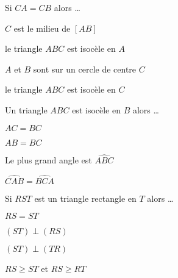 

  
\begin{QCM}
  \begin{GroupeQCM} 
    \begin{exercice}
      Si $CA = CB$ alors \ldots
      \begin{ChoixQCM}{4}
      \item $C$ est le milieu de $[AB]$
      \item le triangle $ABC$ est isocèle en $A$
      \item $A$ et $B$ sont sur un cercle de centre $C$
      \item le triangle $ABC$ est isocèle en $C$
      \end{ChoixQCM}
\begin{corrige}
   \end{corrige}
    \end{exercice}
    

    \begin{exercice}
      Un triangle $ABC$ est isocèle en $B$ alors \ldots
      \begin{ChoixQCM}{4}
      \item $AC = BC$
      \item $AB = BC$
      \item Le plus grand angle est $\widehat{ABC}$
      \item $\widehat{CAB} = \widehat{BCA}$
      \end{ChoixQCM}
\begin{corrige}
   \end{corrige}
    \end{exercice}


    \begin{exercice}
      Si $RST$ est un triangle rectangle en $T$ alors \ldots
      \begin{ChoixQCM}{4}
      \item $RS = ST$
      \item $(ST) \perp (RS)$
      \item $(ST) \perp (TR)$
      \item $RS \geqslant ST$ et $RS \geqslant RT$
      \end{ChoixQCM}
\begin{corrige}
   \end{corrige}
    \end{exercice}
    


\end{GroupeQCM}
\end{QCM}

